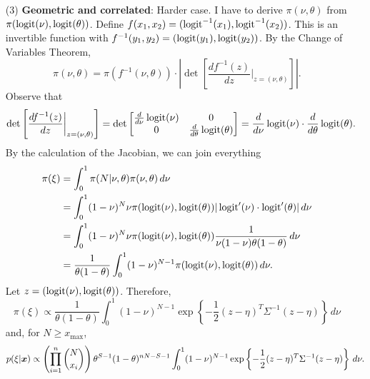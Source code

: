 \begin{enumerate}
    \item[(3)]  {\bf Geometric and correlated}: Harder case. I
    have to derive $\pi(\nu,\theta)$ from $\pi(\operatorname{logit}(\nu), \operatorname{logit}(\theta))$.
    Define $f(x_1,x_2) = (\operatorname{logit}^{-1}(x_1), \operatorname{logit}^{-1}(x_2))$. This is an
    invertible function with $f^{-1}(y_1,y_2) = (\operatorname{logit}(y_1), \operatorname{logit}(y_2))$. By
    the Change of Variables Theorem, 
    $$
    \pi(\nu,\theta) = \pi(f^{-1}(\nu, \theta))\cdot\left|\det \left[\frac{df^{-1}(z)}{dz}\bigg|_{z=(\nu,\theta)}\right]\right|.
    $$
    Observe that 
    $$
    \det \left[\frac{df^{-1}(z)}{dz}\bigg|_{z=(\nu,\theta)}\right] = \det \begin{bmatrix}
        \frac{d}{d\nu}\operatorname{logit}(\nu) & 0 \\
        0 & \frac{d}{d\theta}\operatorname{logit}(\theta)
    \end{bmatrix} = \frac{d}{d\nu}\operatorname{logit}(\nu) \cdot \frac{d}{d\theta}\operatorname{logit}(\theta).
    $$
    By the calculation of the Jacobian, we can join everything
    \begin{equation*}
        \begin{split}
            \pi(\xi) &= \int_0^{1} \pi(N|\nu,\theta)\pi(\nu,\theta) \, d\nu  \\
            &= \int_0^1 (1-\nu)^N\nu \pi(\operatorname{logit}(\nu), \operatorname{logit}(\theta))|\operatorname{logit} '(\nu) \cdot \operatorname{logit} '(\theta)| \, d\nu \\
            &= \int_0^1 (1-\nu)^N\nu \pi(\operatorname{logit}(\nu), \operatorname{logit}(\theta))\frac{1}{\nu(1-\nu)\theta(1-\theta)}\, d\nu \\ 
            &= \frac{1}{\theta(1-\theta)}\int_0^1 (1-\nu)^{N-1}\pi(\operatorname{logit}(\nu), \operatorname{logit}(\theta)) \, d\nu . \\
        \end{split}
    \end{equation*} 
    Let $z = (\operatorname{logit}(\nu), \operatorname{logit}(\theta))$. Therefore, 
    \begin{equation}
        \label{eq:prior-geom-corr}
        \pi(\xi) \propto \frac{1}{\theta(1-\theta)}\int_0^1 (1-\nu)^{N-1}\exp\left\{-\frac{1}{2}(z - \eta)^T\Sigma^{-1}(z-\eta)\right\} \, d\nu
    \end{equation}
    and, for $N \ge x_{\max}$, 
    \begin{equation}
        \label{eq:posterior-geom-corr}
        p(\xi|\boldsymbol{x}) \propto \left(\prod_{i=1}^n \binom{N}{x_i}\right)\theta^{S-1}(1 - \theta)^{nN - S-1}\int_0^1 (1-\nu)^{N-1}\exp\left\{-\frac{1}{2}(z - \eta)^T\Sigma^{-1}(z-\eta)\right\} \, d\nu.
    \end{equation}

\end{enumerate}

\vspace{2ex}